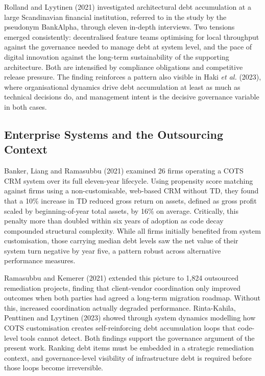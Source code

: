 \documentclass[
  12pt,
  letterpaper,
  12pt,
  oneside,
  english,
  onehalfspacing,
  headsepline]{MastersDoctoralThesis}
\begin{document}
Rolland and Lyytinen (2021) investigated architectural debt accumulation
at a large Scandinavian financial institution, referred to in the study
by the pseudonym BankAlpha, through eleven in-depth interviews. Two
tensions emerged consistently: decentralised feature teams optimising
for local throughput against the governance needed to manage debt at
system level, and the pace of digital innovation against the long-term
sustainability of the supporting architecture. Both are intensified by
compliance obligations and competitive release pressure. The finding
reinforces a pattern also visible in Haki \emph{et al.} (2023), where
organisational dynamics drive debt accumulation at least as much as
technical decisions do, and management intent is the decisive governance
variable in both cases.

\subsection{Enterprise Systems and the Outsourcing
Context}\label{enterprise-systems-and-the-outsourcing-context}

Banker, Liang and Ramasubbu (2021) examined 26 firms operating a COTS
CRM system over its full eleven-year lifecycle. Using propensity score
matching against firms using a non-customisable, web-based CRM without
TD, they found that a 10\% increase in TD reduced gross return on
assets, defined as gross profit scaled by beginning-of-year total
assets, by 16\% on average. Critically, this penalty more than doubled
within six years of adoption as code decay compounded structural
complexity. While all firms initially benefited from system
customisation, those carrying median debt levels saw the net value of
their system turn negative by year five, a pattern robust across
alternative performance measures.

Ramasubbu and Kemerer (2021) extended this picture to 1,824 outsourced
remediation projects, finding that client-vendor coordination only
improved outcomes when both parties had agreed a long-term migration
roadmap. Without this, increased coordination actually degraded
performance. Rinta-Kahila, Penttinen and Lyytinen (2023) showed through
system dynamics modelling how COTS customisation creates
self-reinforcing debt accumulation loops that code-level tools cannot
detect. Both findings support the governance argument of the present
work. Ranking debt items must be embedded in a strategic remediation
context, and governance-level visibility of infrastructure debt is
required before those loops become irreversible.
\end{document}
